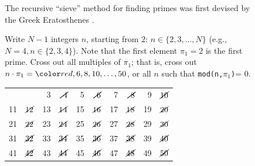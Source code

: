 \documentclass{ximera}
\begin{document}
  
  

\begin{figure}[htbp]

 \begin{tcolorbox}
The recursive ``sieve'' method for finding primes was first devised by the Greek Eratosthenes
 \citep{o2009genuine}.
 \end{tcolorbox}
\vspace*{1cm}

	\Be %
\item Write $N-1$ integers $n$, starting from $2$: $n \in \{2, 3, \dots, N\}$
 (e.g., $N=4, n \in \{2, 3, 4\}$).  Note that the first element $\pi_1=2$ is the first prime.
 Cross out all multiples of $\pi_1$; that is, cross out $n\cdot\pi_1 = {\red, 6, 8, 10, \dots, 50}$,
 or all $n$ such that \texttt{mod(n,$\pi_1$)}= 0.
 \begin{tcolorbox}
 \begin{center}
\begin{tabular}{r r r r r r r r r r}
     & {\bf \red 2} & 3 & $\cancel{\ 4}$ & 5 & $\cancel{\ 6}$ & 7 & $\cancel{\ 8}$ & 9 & $\cancel{10}$ \\
  11 & $\cancel{12}$ & 13 & $\cancel{14}$ & 15 & $\cancel{16}$ & 17 & $\cancel{18}$ & 19 & $\cancel{20}$ \\
  21 & $\cancel{22}$ & 23 & $\cancel{24}$ & 25 & $\cancel{26}$ & 27 & $\cancel{28}$ & 29 & $\cancel{30}$ \\
  31 & $\cancel{32}$ & 33 & $\cancel{34}$ & 35 & $\cancel{36}$ & 37 & $\cancel{38}$ & 39 & $\cancel{40}$ \\
  41 & $\cancel{42}$ & 43 & $\cancel{44}$ & 45 & $\cancel{46}$ & 47 & $\cancel{48}$ & 49 & $\cancel{50}$ \\
\end{tabular}
 \end{center}
 \end{tcolorbox}


\end{figure}
\end{document}
